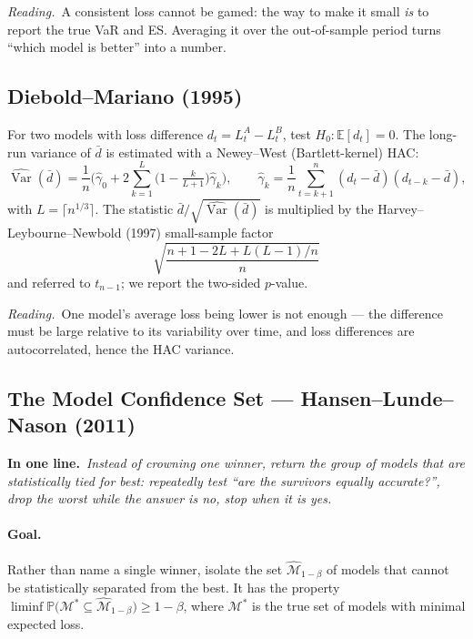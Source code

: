 \documentclass[11pt,a4paper]{article}
\newcommand{\E}{\mathbb{E}}
\newcommand{\Var}{\operatorname{Var}}
\newcommand{\Prob}{\mathbb{P}}
\newcommand{\Mcal}{\mathcal{M}}
\newcommand{\intuition}[1]{\par\smallskip\noindent\textit{Reading.}\ #1\par\smallskip}
\newcommand{\inbrief}[1]{\par\noindent\textbf{In one line.}\ \textit{#1}\par\smallskip}
\begin{document}
\intuition{A consistent loss cannot be gamed: the way to make it small \emph{is}
to report the true VaR and ES. Averaging it over the out-of-sample period turns
``which model is better'' into a number.}

\subsection{Diebold--Mariano (1995)}

For two models with loss difference $d_t = L^{A}_t - L^{B}_t$, test
$H_0:\E[d_t]=0$. The long-run variance of $\bar d$ is estimated with a
Newey--West (Bartlett-kernel) HAC:
\begin{equation}
  \widehat{\Var}(\bar d)
  = \frac1n\Big(\hat\gamma_0 + 2\sum_{k=1}^{L}\big(1 - \tfrac{k}{L+1}\big)\hat\gamma_k\Big),
  \qquad
  \hat\gamma_k = \frac1n\sum_{t=k+1}^{n}(d_t - \bar d)(d_{t-k} - \bar d),
\end{equation}
with $L = \lceil n^{1/3}\rceil$. The statistic $\bar d/\sqrt{\widehat{\Var}(\bar
d)}$ is multiplied by the Harvey--Leybourne--Newbold (1997) small-sample factor
\begin{equation}
  \sqrt{\frac{n + 1 - 2L + L(L-1)/n}{n}}
\end{equation}
and referred to $t_{n-1}$; we report the two-sided $p$-value.

\intuition{One model's average loss being lower is not enough --- the difference
must be large relative to its variability over time, and loss differences are
autocorrelated, hence the HAC variance.}

\subsection{The Model Confidence Set --- Hansen--Lunde--Nason (2011)}\label{sec:mcs}

\inbrief{Instead of crowning one winner, return the group of models that are
statistically tied for best: repeatedly test ``are the survivors equally
accurate?'', drop the worst while the answer is no, stop when it is yes.}

\paragraph{Goal.} Rather than name a single winner, isolate the set
$\widehat{\Mcal}_{1-\beta}$ of models that cannot be statistically separated
from the best. It has the property
$\liminf \Prob\big(\Mcal^{\ast}\subseteq\widehat{\Mcal}_{1-\beta}\big)\ge 1-\beta$,
where $\Mcal^{\ast}$ is the true set of models with minimal expected loss.
\end{document}
